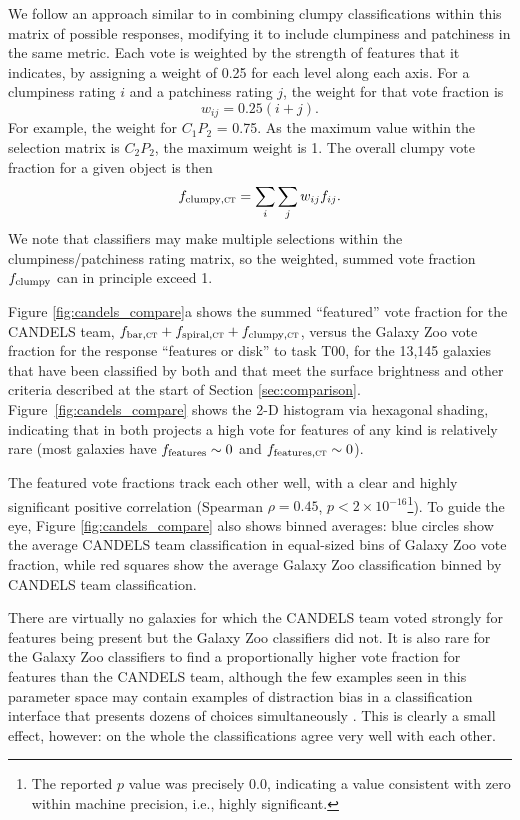 \documentclass[useAMS,usenatbib]{mn2e}
\begin{document}
{We follow an approach similar to \citet{guo15} in combining clumpy classifications within this matrix of possible responses, modifying it to include clumpiness and patchiness in the same metric. Each vote is weighted by the strength of features that it indicates, by assigning a weight of 0.25 for each level along each axis. For a clumpiness rating $i$ and a patchiness rating $j$, the weight for that vote fraction is $$w_{ij} = 0.25 (i + j) .$$ For example, the weight for $C_1 P_2$ = 0.75. As the maximum value within the selection matrix is  $C_2 P_2$, the maximum weight is 1. The overall clumpy vote fraction for a given object is then $$f_{\rm clumpy, \textsc{ct}} = \sum_i{\sum_j{w_{ij} f_{ij}}} .$$ We note that classifiers may make multiple selections within the clumpiness/patchiness rating matrix, so the weighted, summed vote fraction $f_{\rm clumpy}$ can in principle exceed 1.

Figure \ref{fig:candels_compare}a shows the summed ``featured'' vote fraction for the CANDELS team, $f_{\rm bar, \textsc{ct}} + f_{\rm spiral, \textsc{ct}} + f_{\rm clumpy, \textsc{ct}}$, versus the Galaxy Zoo vote fraction for the response ``features or disk'' to task T00, for the 13,145 galaxies that have been classified by both and that meet the surface brightness and other criteria described at the start of Section \ref{sec:comparison}. Figure~\ref{fig:candels_compare} shows the 2-D histogram via hexagonal shading, indicating that in both projects a high vote for features of any kind is relatively rare (most galaxies have $f_{\rm features} \sim 0$ and $f_{\rm features, \textsc{ct}} \sim 0$). 

The featured vote fractions track each other well, with a clear and highly significant positive correlation (Spearman $\rho = 0.45$, $p < 2 \times 10^{-16}$\footnote[\dagger]{The reported $p$ value was precisely $0.0$, indicating a value consistent with zero within machine precision, i.e., highly significant.}). To guide the eye, Figure \ref{fig:candels_compare} also shows binned averages: blue circles show the average CANDELS team classification in equal-sized bins of Galaxy Zoo vote fraction, while red squares show the average Galaxy Zoo classification binned by CANDELS team classification. 

There are virtually no galaxies for which the CANDELS team voted strongly for features being present but the Galaxy Zoo classifiers did not. It is also rare for the Galaxy Zoo classifiers to find a proportionally higher vote fraction for features than the CANDELS team, although the few examples seen in this parameter space may contain examples of distraction bias in a classification interface that presents dozens of choices simultaneously \citep[e.g.,][]{simons99,iyengar00}. This is clearly a small effect, however: on the whole the classifications agree very well with each other.



}
\end{document}
